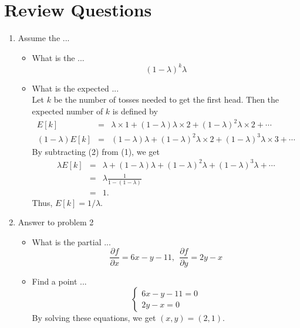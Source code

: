 

\oddsidemargin 0in
\evensidemargin 0in
\textwidth 6.5in
\topmargin -0.5in
\textheight 9.0in




\pagestyle{myheadings}  %

\section{Review Questions}

\begin{enumerate}
\item Assume the ... 
\begin{itemize}
\item What is the ...
\[
(1-\lambda)^k \lambda
\]
\item What is the expected ...\\
Let $k$ be the number of tosses needed to get the first head. Then the expected number of $k$ is defined by
\begin{eqnarray}
E[k]&=&\lambda \times 1 + (1-\lambda) \lambda \times 2 + (1-\lambda)^2 \lambda \times 2 + \cdots\\
(1-\lambda)E[k]&=&(1-\lambda)\lambda + (1-\lambda)^2 \lambda \times 2 + (1-\lambda)^3 \lambda \times 3 + \cdots
\end{eqnarray}
By subtracting (2) from (1), we get
\begin{eqnarray*}
\lambda E[k] &=& \lambda + (1-\lambda) \lambda + (1-\lambda)^2 \lambda + (1-\lambda)^3 \lambda + \cdots\\
 &=&\lambda \frac{1}{1 - (1 - \lambda)}\\
 &=&1 .
\end{eqnarray*}
Thus, $E[k]=1 / \lambda $.
\end{itemize}

\item Answer to problem 2

\begin{itemize}
\item What is the partial ...
\[
\frac{\partial f}{\partial x}=6x-y-11,\:\:  \frac{\partial f}{\partial y}=2y - x
\]
\item Find a point ...
\[
\left\{
\begin{array}{l}
6x-y-11=0 \\
2y-x=0
\end{array}
\right.
\]
By solving these equations, we get $(x, y)=(2, 1)$.
\end{itemize}


\end{enumerate}
